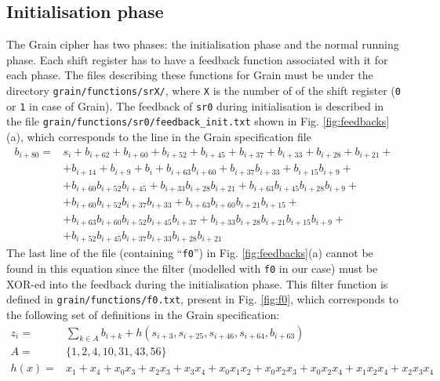 \documentclass{llncs}
\begin{document}
\subsection{Initialisation phase}
The Grain cipher has two phases: the initialisation phase and the normal running phase. Each shift register has to have a feedback function associated with it for each phase. The files describing these functions for Grain must be under the directory \texttt{grain/functions/srX/}, where \texttt{X} is the number of of the shift register (\texttt{0} or \texttt{1} in case of Grain). The feedback of \texttt{sr0} during initialisation is described in the file \texttt{grain/functions/sr0/feedback\_init.txt} shown in Fig. \ref{fig:feedbacks}(a), which corresponds to the line in the Grain specification file
\begin{align*}
b_{i+80} =& s_{i} + b_{i+62} + b_{i+60} + b_{i+52} + b_{i+45} + b_{i+37} + b_{i+33} + b_{i+28} + b_{i+21} +\\
&+b_{i+14} + b_{i+9} + b_{i} + b_{i+63} b_{i+60} + b_{i+37} b_{i+33} + b_{i+15} b_{i+9} +\\
&+b_{i+60} b_{i+52} b_{i+45} + b_{i+33} b_{i+28} b_{i+21} + b_{i+63} b_{i+45} b_{i+28} b_{i+9} +\\
&+b_{i+60} b_{i+52} b_{i+37} b_{i+33} + b_{i+63} b_{i+60} b_{i+21} b_{i+15} +\\
&+b_{i+63} b_{i+60} b_{i+52} b_{i+45} b_{i+37} + b_{i+33} b_{i+28} b_{i+21} b_{i+15} b_{i+9} +\\
&+b_{i+52} b_{i+45} b_{i+37} b_{i+33} b_{i+28} b_{i+21}
\end{align*}
The last line of the file (containing ``\texttt{f0}'') in Fig. \ref{fig:feedbacks}(a) cannot be found in this equation since the filter (modelled with \texttt{f0} in our case) must be XOR-ed into the feedback during the initialisation phase. This filter function is defined in \texttt{grain/functions/f0.txt}, present in Fig. \ref{fig:f0}, which corresponds to the following set of definitions in the Grain specification:
\begin{align*}
z_i =& \sum_{k\in A} b_{i+k} + h(s_{i+3} , s_{i+25} , s_{i+46} , s_{i+64} , b_{i+63})\\
A =& \{1, 2, 4, 10, 31,43, 56\}\\
h(x) =& x_1 +x_4 +x_0 x_3 +x_2 x_3 +x_3 x_4 +x_0 x_1 x_2 +x_0 x_2 x_3 +x_0 x_2 x_4 +x_1 x_2 x_4 +x_2 x_3 x_4
\end{align*}


\newbox\subfigbox
\makeatletter
\newenvironment{subfloat}%
{\def\caption##1{\gdef\subcapsave{\relax##1}}%
\let\subcapsave=\@empty %
\let\sf@oldlabel=\label
\def\label##1{\xdef\sublabsave{\noexpand\label{##1}}}%
\let\sublabsave\relax
\setbox\subfigbox\hbox
\bgroup}%
{\egroup
\let\label=\sf@oldlabel
\subfigure[\subcapsave]{\box\subfigbox}}%
\makeatother
\end{document}
